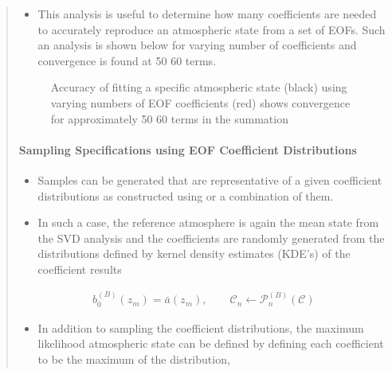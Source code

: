 \documentclass[letterpaper,10pt,english]{sphinxmanual}
\let\sphinxpxdimen\pdfpxdimen\else\newdimen\sphinxpxdimen
\begin{document}
\begin{itemize}
\begin{quote}
\begin{sphinxVerbatim}[commandchars=\\\{\}]
   
\end{sphinxVerbatim}
\begin{itemize}
\item {} 
This analysis is useful to determine how many coefficients are needed to accurately reproduce an atmospheric state from a set of EOFs.  Such an analysis is shown below for varying number of coefficients and convergence is found at 50 \sphinxhyphen{} 60 terms.

\end{itemize}

\begin{figure}[htbp]
\centering
\capstart

\noindent\sphinxincludegraphics[width=700\sphinxpxdimen]{{US_NE-fits}.png}
\caption{Accuracy of fitting a specific atmospheric state (black) using varying numbers of EOF coefficients (red) shows convergence for approximately 50 \sphinxhyphen{} 60 terms in the summation}\label{\detokenize{sampling:id1}}\end{figure}


\paragraph{Sampling Specifications using EOF Coefficient Distributions}
\label{\detokenize{sampling:sampling-specifications-using-eof-coefficient-distributions}}\begin{itemize}
\item {} 
Samples can be generated that are representative of a given coefficient distributions as constructed using  or a combination of them.

\item {} 
In such a case, the reference atmosphere is again the mean state from the SVD analysis and the coefficients are randomly generated from the distributions defined by kernel density estimates (KDE’s) of the coefficient results

\end{itemize}
\begin{equation*}
\begin{split}b_0^{(B)} \left( z_m \right) = \bar{a}  \left( z_m \right) , \quad \quad \mathcal{C}_n \longleftarrow \mathcal{P}_n^{(B)} \left( \mathcal{C} \right)\end{split}
\end{equation*}\begin{itemize}
\item {} 
In addition to sampling the coefficient distributions, the maximum likelihood atmospheric state can be defined by defining each coefficient to be the maximum of the distribution,


\end{itemize}
\end{quote}
\end{itemize}
\end{document}
